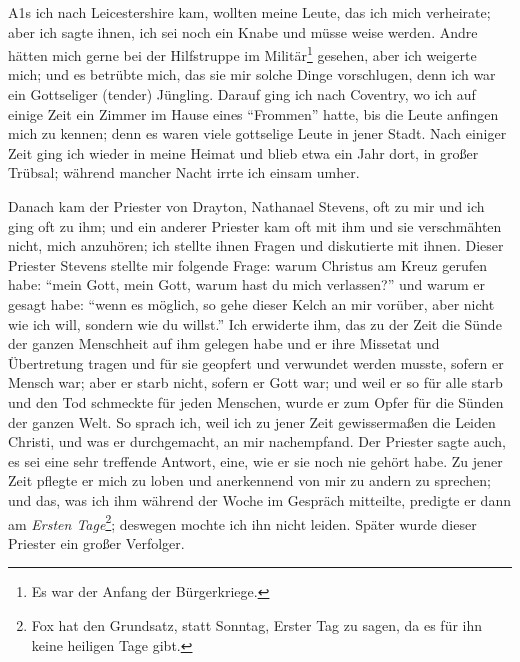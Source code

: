 A1s ich nach Leicestershire kam, wollten meine Leute, das ich
mich verheirate; aber ich sagte ihnen, ich sei noch ein Knabe und
müsse weise werden. Andre hätten mich gerne bei der Hilfstruppe
im Militär\footnote{Es war der Anfang der Bürgerkriege.}
gesehen, aber ich weigerte mich; und es betrübte mich,
das sie mir solche Dinge vorschlugen, denn ich war ein Gottseliger
(tender) Jüngling. Darauf ging ich nach Coventry, wo ich auf
einige Zeit ein Zimmer im Hause eines "`Frommen"' hatte, bis
die Leute anfingen mich zu kennen; denn es waren viele gottselige 
Leute in jener Stadt. Nach einiger Zeit ging ich wieder
in meine Heimat und blieb etwa ein Jahr dort, in großer Trübsal; 
während mancher Nacht irrte ich einsam umher.

Danach kam der Priester von Drayton, Nathanael Stevens,
oft zu mir und ich ging oft zu ihm; und ein anderer Priester
kam oft mit ihm und sie verschmähten nicht, mich anzuhören; ich
stellte ihnen Fragen und diskutierte mit ihnen. Dieser Priester
Stevens stellte mir folgende Frage: warum Christus am Kreuz
gerufen habe: "`mein Gott, mein Gott, warum hast du mich verlassen?"' 
und warum er gesagt habe: "`wenn es möglich, so gehe
dieser Kelch an mir vorüber, aber nicht wie ich will, sondern wie
du willst."' Ich erwiderte ihm, das zu der Zeit die Sünde der
ganzen Menschheit auf ihm gelegen habe und er ihre Missetat
und Übertretung tragen und für sie geopfert und verwundet
werden musste, sofern er Mensch war; aber er starb nicht, sofern
er Gott war; und weil er so für alle starb und den Tod schmeckte
für jeden Menschen, wurde er zum Opfer für die Sünden der
ganzen Welt. So sprach ich, weil ich zu jener Zeit gewissermaßen 
die Leiden Christi, und was er durchgemacht, an mir
nachempfand. Der Priester sagte auch, es sei eine sehr treffende
Antwort, eine, wie er sie noch nie gehört habe. Zu jener Zeit
pflegte er mich zu loben und anerkennend von mir zu andern zu
sprechen; und das, was ich ihm während der Woche im Gespräch
mitteilte, predigte er dann am \textit{Ersten Tage}\footnote{Fox 
hat den Grundsatz, statt Sonntag, Erster Tag zu sagen, da es für
ihn keine heiligen Tage gibt.}; deswegen mochte
ich ihn nicht leiden. Später wurde dieser Priester ein großer
Verfolger.

